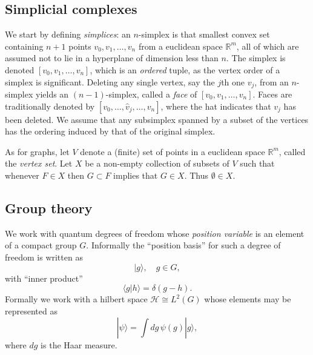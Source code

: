 \documentclass[12pt]{amsart}
\theoremstyle{definition}
\theoremstyle{remark}
\numberwithin{equation}{section}
\begin{document}
\subsection{Simplicial complexes}
We start by defining \emph{simplices}: an $n$-simplex is that smallest convex set containing $n+1$ points $v_0, v_1, \ldots, v_n$ from a euclidean space $\mathbb{R}^m$, all of which are assumed not to lie in a hyperplane of dimension less than $n$. The simplex is denoted $[v_0, v_1,\ldots, v_n]$, which is an \emph{ordered} tuple, as the vertex order of a simplex is significant. Deleting any single vertex, say the $j$th one $v_j$, from an $n$-simplex yields an $(n-1)$-simplex, called a \emph{face} of $[v_0, v_1, \ldots, v_n]$. Faces are traditionally denoted by $[v_0, \ldots, \widehat{v}_j, \ldots, v_n]$, where the hat indicates that $v_j$ has been deleted. We assume that any subsimplex spanned by a subset of the vertices has the ordering induced by that of the original simplex.

As for graphs, let $V$ denote a (finite) set of points in a euclidean space $\mathbb{R}^m$, called the \emph{vertex set}. Let $X$ be a non-empty collection of subsets of $V$ such that whenever $F\in X$ then $G\subset F$ implies that $G\in X$. Thus $\emptyset \in X$. 

\subsection{Group theory}
We work with quantum degrees of freedom whose \emph{position variable} is an element of a compact group $G$. Informally the ``position basis'' for such a degree of freedom is written as  
\begin{equation}
	|g\rangle, \quad g\in G,
\end{equation}
with ``inner product''
\begin{equation}
	\langle g|h\rangle = \delta(g-h).
\end{equation}
Formally we work with a hilbert space $\mathcal{H} \cong L^2(G)$ whose elements may be represented as
\begin{equation}
	|\psi\rangle = \int dg\, \psi(g)|g\rangle,
\end{equation}
where $dg$ is the Haar measure.
\end{document}

